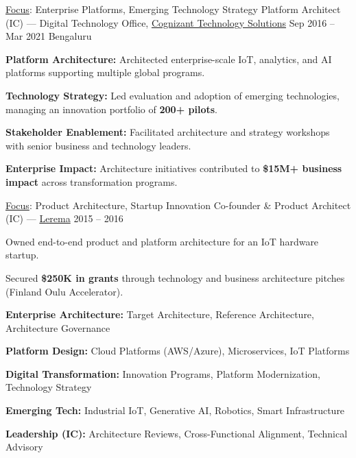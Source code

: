 \documentclass[11pt, a4paper]{awesome-cv}
\begin{document}
\begin{cventries}
\vspace{1.2em}

\cventry
  {\underline{Focus}: Enterprise Platforms, Emerging Technology Strategy}
  {Platform Architect (IC) — Digital Technology Office, \underline{Cognizant Technology Solutions}}
  {Sep 2016 – Mar 2021}
  {Bengaluru}
  {
    \begin{cvitems}
      \item {\textbf{Platform Architecture:} Architected enterprise-scale IoT, analytics, and AI platforms supporting multiple global programs.}
      \item {\textbf{Technology Strategy:} Led evaluation and adoption of emerging technologies, managing an innovation portfolio of \textbf{200+ pilots}.}
      \item {\textbf{Stakeholder Enablement:} Facilitated architecture and strategy workshops with senior business and technology leaders.}
      \item {\textbf{Enterprise Impact:} Architecture initiatives contributed to \textbf{\$15M+ business impact} across transformation programs.}
    \end{cvitems}
  }

\vspace{1.2em}

\cventry
  {\underline{Focus}: Product Architecture, Startup Innovation}
  {Co-founder \& Product Architect (IC) — \underline{Lerema}}
  {2015 – 2016}
  {}
  {
    \begin{cvitems}
      \item {Owned end-to-end product and platform architecture for an IoT hardware startup.}
      \item {Secured \textbf{\$250K in grants} through technology and business architecture pitches (Finland Oulu Accelerator).}
    \end{cvitems}
  }

\end{cventries}


\vspace{-1.5em}
\begin{cvitems}
  \item {\textbf{Enterprise Architecture:} Target Architecture, Reference Architecture, Architecture Governance}
  \item {\textbf{Platform Design:} Cloud Platforms (AWS/Azure), Microservices, IoT Platforms}
  \item {\textbf{Digital Transformation:} Innovation Programs, Platform Modernization, Technology Strategy}
  \item {\textbf{Emerging Tech:} Industrial IoT, Generative AI, Robotics, Smart Infrastructure}
  \item {\textbf{Leadership (IC):} Architecture Reviews, Cross-Functional Alignment, Technical Advisory}
\end{cvitems}
\end{document}

